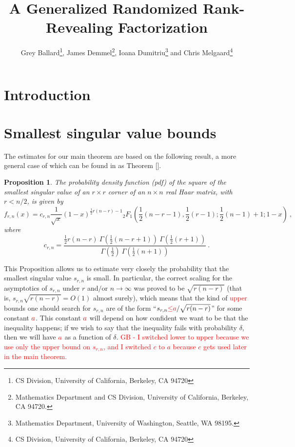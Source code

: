 \documentclass{article}
\title{A Generalized Randomized Rank-Revealing Factorization}
\author{Grey Ballard\thanks{CS Division, University of California, Berkeley, CA 94720},
James Demmel\thanks{Mathematics Department and CS Division,
University of California, Berkeley, CA 94720.},
Ioana Dumitriu\thanks{Mathematics Department, University of Washington, Seattle, WA 98195.} and Chris Melgaard\thanks{CS Division, University of California, Berkeley, CA 94720}}
\newcommand{\red}[1]{\textcolor{red}{#1}}
\newtheorem{proposition}[theorem]{Proposition}
\theoremstyle{definition}
\newcommand{\smin}{s_{r,n}}
\begin{document}
\maketitle

\begin{abstract}

\end{abstract}

\section{Introduction} \label{Intro} 

\section{Smallest singular value bounds}

The estimates for our main theorem are based on the following result, a more general case of which can be found in \cite{dumitriu?} as Theorem []. 


\begin{proposition} The probability density function (pdf) of the square of the smallest singular value of an $r \times r$ corner of an $n \times n$ real Haar matrix, with $r < n/2$, is given by
\[
f_{r,n}(x) = c_{r,n} \frac{1}{\sqrt{x}} (1 - x)^{\frac{1}{2}r(n-r)-1}  {_{2}F_{1}} \left ( \frac{1}{2}(n-r-1), \frac{1}{2}(r-1); \frac{1}{2}(n-1)+1; 1-x \right)~,
\]
where
\[
c_{r,n} = \frac{\frac{1}{2}r(n-r) ~\Gamma \left( \frac{1}{2}(n-r+1) \right) ~\Gamma \left ( \frac{1}{2}(r+1) \right)}{\Gamma \left (\frac{1}{2} \right) ~\Gamma \left ( \frac{1}{2} (n+1) \right)}~.
\]
\end{proposition}

This Proposition allows us to estimate very closely the probability that the smallest singular value $\smin$ is small. In particular, the correct scaling for the asymptotics of $\smin$ under $r$ and$\slash$or $n \rightarrow \infty$ was proved to be $\sqrt{r(n-r)}$ (that is, $\smin \sqrt{r(n-r)} = O(1)$ almost surely), which means that the kind of \red{upper} bounds one should search for $\smin$ are of the form ``$\smin \red{\leq} \red{a}/\sqrt{r(n-r)}$'' for some constant $\red{a}$. This constant $\red{a}$ will depend on how confident we want to be that the inequality happens; if we wish to say that the inequality fails with probability $\delta$, then we will have $\red{a}$ as a function of $\delta$. \red{GB -  I switched lower to upper because we use only the upper bound on $\smin$, and I switched $c$ to $a$ because $c$ gets used later in the main theorem.}
\end{document}
